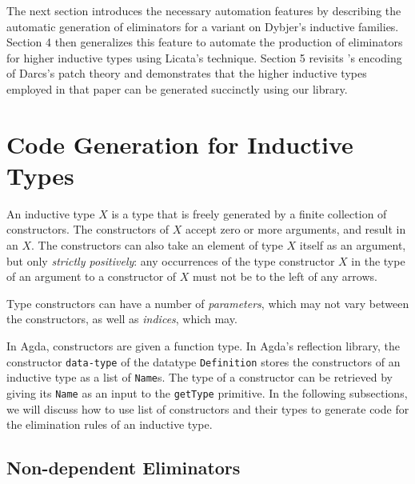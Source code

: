 \documentclass[sigplan,10pt]{acmart}
\begin{document}
The next section introduces the necessary automation features by describing the automatic generation of eliminators for a variant on Dybjer's inductive families. Section 4 then generalizes this feature to automate the production of eliminators for higher inductive types using Licata's technique. Section 5 revisits \citeauthor{Angiuli-2014}'s encoding of Darcs's patch theory \citep{Angiuli-2014} and demonstrates that the higher inductive types employed in that paper can be generated succinctly using our library.

\section{Code Generation for Inductive Types}
\label{sec:sec3}
An inductive type $X$ is a type that is freely generated by a finite collection of constructors. The constructors of $X$ accept zero or more arguments, and result in an $X$. The constructors can also take an element of type $X$ itself as an argument, but only \emph{strictly positively}: any occurrences of the type constructor $X$ in the type of an argument to a constructor of $X$ must not be to the left of any arrows.

Type constructors can have a number of \emph{parameters}, which may not vary between the constructors, as well as \emph{indices}, which may.


In Agda, constructors are given a function type. In Agda's reflection library, the constructor {\tt data-type} of the datatype {\tt Definition} stores the constructors of an inductive type as a list of \texttt{Name}s. The type of a constructor can be retrieved by giving its {\tt Name} as an input to the {\tt getType} primitive. In the following subsections, we will discuss how to use list of constructors and their types to generate code for the elimination rules of an inductive type.

\subsection{Non-dependent Eliminators}
\label{sec:sec3.1}

\newcommand*{\KW}[1]{\textsf{\textbf{#1}}}
\newcommand*{\SET}{\textsf{Set}}
\end{document}
